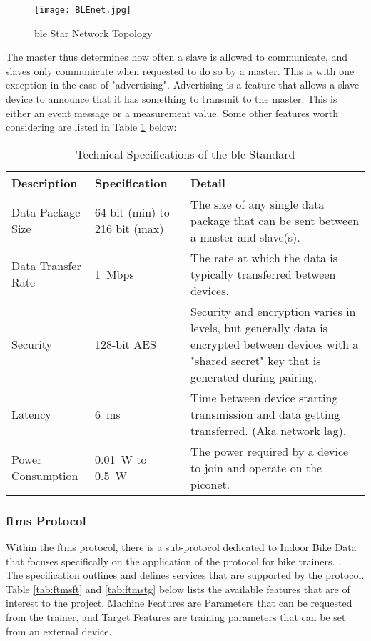 \begin{figure}[H]
	\begin{center}
		\texttt{[image: BLEnet.jpg]}
		\caption{\ac{ble} Star Network Topology}
		\label{fig:ble}
	\end{center}
\end{figure}

The master thus determines how often a slave is allowed to communicate, and slaves only communicate when requested to do so by a master. This is with one exception in the case of "advertising". Advertising is a feature that allows a slave device to announce that it has something to transmit to the master. This is either an event message or a measurement value.
\newpage
Some other features worth considering are listed in Table \ref{tab:ble} below:
\begin{table}[H]
	\renewcommand{\arraystretch}{1.5}
	\centering
	\caption{Technical Specifications of the \ac{ble} Standard}
	\begin{tabularx}{0.9\textwidth}{>{\raggedright}p{2.5cm} >{\raggedright}p{3cm} >{\raggedright\arraybackslash}X}
		\toprule
		Description & Specification & Detail\\
		\midrule
		Data Package Size & 64 bit (min) to 216 bit (max) & The size of any single data package that can be sent between a master and slave(s).\\
		Data Transfer Rate & \SI{1}{Mbps} & The rate at which the data is typically transferred between devices.\\
		Security & 128-bit AES  & Security and encryption varies in levels, but generally data is encrypted between devices with a "shared secret" key that is generated during pairing.\\
		Latency & \SI{6}{\milli\second} & Time between device starting transmission and data getting transferred. (Aka network lag).\\
		Power Consumption & \SI{0.01}{\watt} to \SI{0.5}{\watt} & The power required by a device to join and operate on the piconet.\\
		\bottomrule
	\end{tabularx}
	\label{tab:ble}
\end{table}

\subsubsection{\ac{ftms} Protocol}\label{sec:ftms}
Within the \ac{ftms} protocol, there is a sub-protocol dedicated to Indoor Bike Data that focuses specifically on the application of the protocol for bike trainers. \cite[section ~4.9]{BLSIG:2017}.\\
The specification outlines and defines services that are supported by the protocol. Table \ref{tab:ftmsft} and \ref{tab:ftmstg} below lists the available features that are of interest to the project. Machine Features are Parameters that can be requested from the trainer, and Target Features are training parameters that can be set from an external device. \citep{BLSIG:2017}

